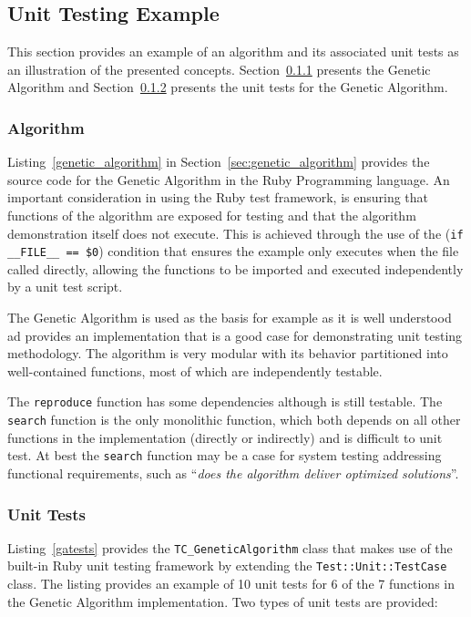 %
%
\subsection{Unit Testing Example}
\label{sec:example}
This section provides an example of an algorithm and its associated unit tests as an illustration of the presented concepts. Section~\ref{subsec:algorithm} presents the Genetic Algorithm and Section~\ref{subsec:tests} presents the unit tests for the Genetic Algorithm.

\subsubsection{Algorithm}
\label{subsec:algorithm}
Listing~\ref{genetic_algorithm} in Section~\ref{sec:genetic_algorithm} provides the source code for the Genetic Algorithm in the Ruby Programming language. An important consideration in using the Ruby test framework, is ensuring that functions of the algorithm are exposed for testing and that the algorithm demonstration itself does not execute. This is achieved through the use of the (\texttt{if \_\_FILE\_\_ == \$0}) condition that ensures the example only executes when the file called directly, allowing the functions to be imported and executed independently by a unit test script.

The Genetic Algorithm is used as the basis for example as it is well understood ad provides an implementation that is a good case for demonstrating unit testing methodology. The algorithm is very modular with its behavior partitioned into well-contained functions, most of which are independently testable. 

The \texttt{reproduce} function has some dependencies although is still testable. The \texttt{search} function is the only monolithic function, which both depends on all other functions in the implementation (directly or indirectly) and is difficult to unit test. At best the \texttt{search} function may be a case for system testing addressing functional requirements, such as ``\emph{does the algorithm deliver optimized solutions}''.


\subsubsection{Unit Tests}
\label{subsec:tests}
Listing~\ref{gatests} provides the \texttt{TC\_GeneticAlgorithm} class that makes use of the built-in Ruby unit testing framework by extending the \texttt{Test::Unit::TestCase} class.
The listing provides an example of 10 unit tests for 6 of the 7 functions in the Genetic Algorithm implementation. Two types of unit tests are provided: 

